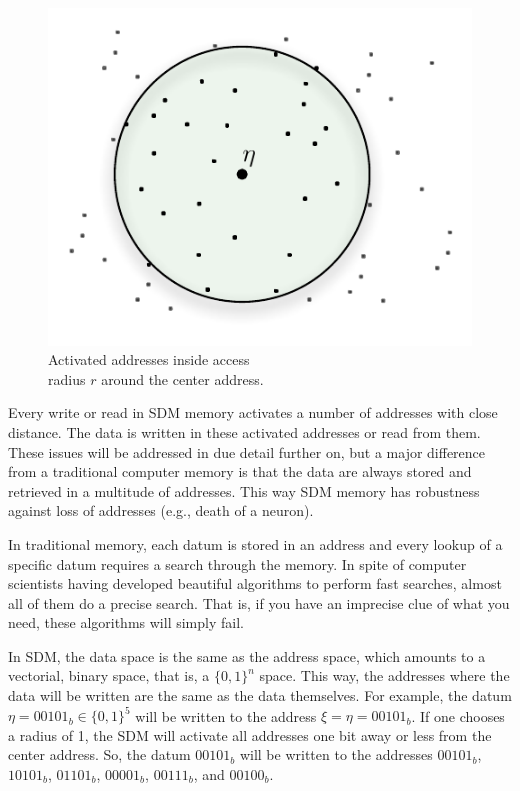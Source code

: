 \begin{figure}[!htb]
\centering\includegraphics[scale=0.75]{./images02/p_circle_r.pdf}

\caption{Activated addresses inside access \protect \\
radius $r$ around the center address.\label{fig-addresses-inside-access-radius}}
\end{figure}



Every write or read in SDM memory activates a number of addresses with close distance.  The data is written in these activated addresses or read from them.  These issues will be addressed in due detail further on, but a major difference from a traditional computer memory is that the data are always stored and retrieved in a multitude of addresses. This way SDM memory has robustness against loss of addresses (e.g., death of a neuron).

In traditional memory, each datum is stored in an address and every lookup of a specific datum requires a search through the memory. In spite of computer scientists having developed beautiful algorithms to perform fast searches, almost all of them do a precise search. That is, if you have an imprecise clue of what you need, these algorithms will simply fail.

In SDM, the data space is the same as the address space, which amounts to a vectorial, binary space, that is, a $\{0,1\}^{n}$ space. This way, the addresses where the data will be written are the same as the data themselves. For example, the datum $\eta=00101_{b}\in\{0,1\}^{5}$ will be written to the address $\xi=\eta=00101_{b}$. If one chooses a radius of 1, the SDM will activate all addresses one bit away or less from the center address. So, the datum $00101_{b}$ will be written to the addresses $00101_{b}$, $10101_{b}$, $01101_{b}$, $00001_{b}$, $00111_{b}$, and $00100_{b}$.

